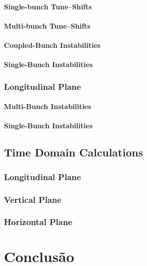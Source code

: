 \subsubsection{Single-bunch Tune--Shifts}
\subsubsection{Multi-bunch Tune--Shifts}
\subsubsection{Coupled-Bunch Instabilities}
\subsubsection{Single-Bunch Instabilities}
\subsection{Longitudinal Plane}
\subsubsection{Multi-Bunch Instabilities}
\subsubsection{Single-Bunch Instabilities}
\section{Time Domain Calculations}
\subsection{Longitudinal Plane}
\subsection{Vertical Plane}
\subsection{Horizontal Plane}


%

\chapter*[Conclusão]{Conclusão}
\lipsum[1-5]


